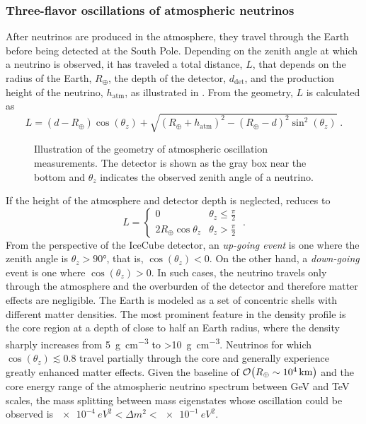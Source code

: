 \subsubsection{Three-flavor oscillations of atmospheric neutrinos}
After neutrinos are produced in the atmosphere, they travel through the Earth before being detected at the South Pole.
Depending on the zenith angle at which a neutrino is observed, it has traveled a total distance, $L$, that depends on the radius of the Earth, $R_\oplus$, the depth of the detector, $d_\mathrm{det}$, and the production height of the neutrino, $h_\mathrm{atm}$, as illustrated in .
From the geometry, $L$ is calculated as
\begin{equation}
    L = (d - R_\oplus)\cos(\theta_z) + \sqrt{(R_\oplus + h_\mathrm{atm})^2 - (R_\oplus - d)^2\sin^2(\theta_z)}\;.\label{eq:prop-distance}
\end{equation}
\begin{figure}
    \centering
    
    \caption{Illustration of the geometry of atmospheric oscillation measurements. The detector is shown as the gray box near the bottom and $\theta_z$ indicates the observed zenith angle of a neutrino.\label{fig:atmo-baseline-illustration}}
\end{figure}
If the height of the atmosphere and detector depth is neglected,  reduces to
\begin{equation}
    L =
    \begin{cases}
        0 & \theta_z \leq \frac{\pi}{2} \\
        2 R_\oplus \cos \theta_z & \theta_z > \frac{\pi}{2}
    \end{cases}\;.
\end{equation}
From the perspective of the IceCube detector, an \emph{up-going event} is one where the zenith angle is $\theta_z > \ang{90}$, that is, $\cos(\theta_z) < 0$. On the other hand, a \emph{down-going} event is one where $\cos(\theta_z) > 0$. In such cases, the neutrino travels only through the atmosphere and the overburden of the detector and therefore matter effects are negligible.  The Earth is modeled as a set of concentric shells with different matter densities. The most prominent feature in the density profile is the core region at a depth of close to half an Earth radius, where the density sharply increases from \SI{5}{\gram\per\centi\meter\cubed} to \SI{>10}{\gram\per\centi\meter\cubed}\cite{PREM}. Neutrinos for which $\cos(\theta_z) \lesssim 0.8$ travel partially through the core and generally experience greatly enhanced matter effects. Given the baseline of $\order{R_\oplus\sim\SI{e4}{km}}$ and the core energy range of the atmospheric neutrino spectrum between GeV and TeV scales, the mass splitting between mass eigenstates whose oscillation could be observed is $\SI{e-4}{eV^2} < \Delta m^2 < \SI{e-1}{eV^2}$.

